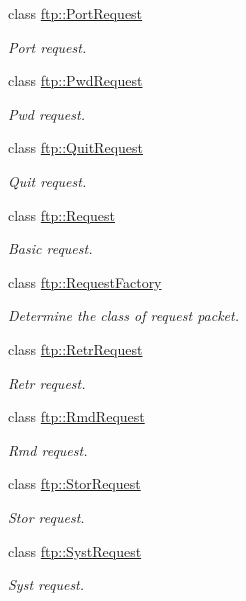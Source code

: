 \begin{DoxyCompactItemize}
class \hyperlink{classftp_1_1_port_request}{ftp\-::\-Port\-Request}
\begin{DoxyCompactList}\small\item\em Port request. \end{DoxyCompactList}\item 
class \hyperlink{classftp_1_1_pwd_request}{ftp\-::\-Pwd\-Request}
\begin{DoxyCompactList}\small\item\em Pwd request. \end{DoxyCompactList}\item 
class \hyperlink{classftp_1_1_quit_request}{ftp\-::\-Quit\-Request}
\begin{DoxyCompactList}\small\item\em Quit request. \end{DoxyCompactList}\item 
class \hyperlink{classftp_1_1_request}{ftp\-::\-Request}
\begin{DoxyCompactList}\small\item\em Basic request. \end{DoxyCompactList}\item 
class \hyperlink{classftp_1_1_request_factory}{ftp\-::\-Request\-Factory}
\begin{DoxyCompactList}\small\item\em Determine the class of request packet. \end{DoxyCompactList}\item 
class \hyperlink{classftp_1_1_retr_request}{ftp\-::\-Retr\-Request}
\begin{DoxyCompactList}\small\item\em Retr request. \end{DoxyCompactList}\item 
class \hyperlink{classftp_1_1_rmd_request}{ftp\-::\-Rmd\-Request}
\begin{DoxyCompactList}\small\item\em Rmd request. \end{DoxyCompactList}\item 
class \hyperlink{classftp_1_1_stor_request}{ftp\-::\-Stor\-Request}
\begin{DoxyCompactList}\small\item\em Stor request. \end{DoxyCompactList}\item 
class \hyperlink{classftp_1_1_syst_request}{ftp\-::\-Syst\-Request}
\begin{DoxyCompactList}\small\item\em Syst request. \end{DoxyCompactList}\item 

\end{DoxyCompactItemize}
